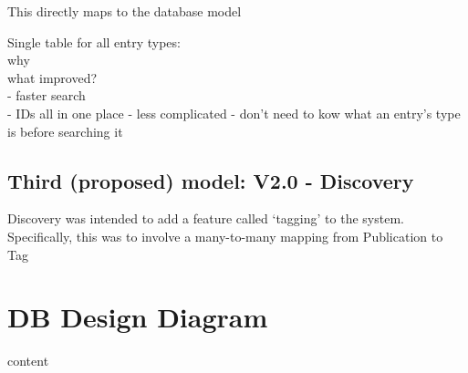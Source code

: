 This directly maps to the database model

Single table for all entry types:\\
why\\
what improved?\\
 - faster search\\
 - IDs all in one place - less complicated - don't need to kow what an entry's type is before searching it\\

\subsection{Third (proposed) model: V2.0 - Discovery}
\label{designDiscovery}
Discovery was intended to add a feature called `tagging' to the system.  \\
Specifically, this was to involve a many-to-many mapping from Publication to Tag


\section{DB Design Diagram}
content
